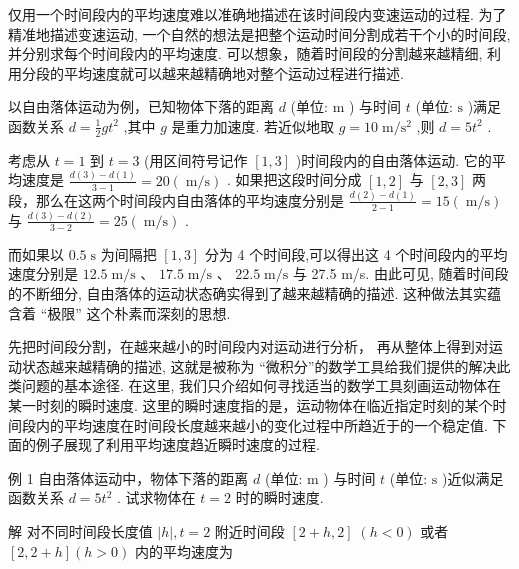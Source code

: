\documentclass[10pt]{article}
\begin{document}
仅用一个时间段内的平均速度难以准确地描述在该时间段内变速运动的过程. 为了精准地描述变速运动, 一个自然的想法是把整个运动时间分割成若干个小的时间段, 并分别求每个时间段内的平均速度. 可以想象，随着时间段的分割越来越精细, 利用分段的平均速度就可以越来越精确地对整个运动过程进行描述.

以自由落体运动为例，已知物体下落的距离 \(d\) (单位: \(\mathrm{m}\) ) 与时间 \(t\) (单位: \(\mathrm{s}\) )满足函数关系 \(d = \frac{1}{2}g{t}^{2}\) ,其中 \(g\) 是重力加速度. 若近似地取 \(g = {10}\mathrm{\;m}/{\mathrm{s}}^{2}\) ,则 \(d = 5{t}^{2}\) .

考虑从 \(t = 1\) 到 \(t = 3\) (用区间符号记作 \(\left\lbrack  {1,3}\right\rbrack\) )时间段内的自由落体运动. 它的平均速度是 \(\frac{d\left( 3\right)  - d\left( 1\right) }{3 - 1} = {20}\left( {\mathrm{\;m}/\mathrm{s}}\right)\) . 如果把这段时间分成 \(\left\lbrack  {1,2}\right\rbrack\) 与 \(\left\lbrack  {2,3}\right\rbrack\) 两段，那么在这两个时间段内自由落体的平均速度分别是 \(\frac{d\left( 2\right)  - d\left( 1\right) }{2 - 1} = {15}\left( {\mathrm{\;m}/\mathrm{s}}\right)\) 与 \(\frac{d\left( 3\right)  - d\left( 2\right) }{3 - 2} = {25}\left( {\mathrm{\;m}/\mathrm{s}}\right)\) .



而如果以 \({0.5}\mathrm{\;s}\) 为间隔把 \(\left\lbrack  {1,3}\right\rbrack\) 分为 4 个时间段,可以得出这 4 个时间段内的平均速度分别是 \({12.5}\mathrm{\;m}/\mathrm{s}\text{ 、 }{17.5}\mathrm{\;m}/\mathrm{s}\text{ 、 }{22.5}\mathrm{\;m}/\mathrm{s}\) 与 27.5 m/s. 由此可见, 随着时间段的不断细分, 自由落体的运动状态确实得到了越来越精确的描述. 这种做法其实蕴含着 “极限” 这个朴素而深刻的思想.

先把时间段分割，在越来越小的时间段内对运动进行分析， 再从整体上得到对运动状态越来越精确的描述, 这就是被称为 “微积分”的数学工具给我们提供的解决此类问题的基本途径. 在这里, 我们只介绍如何寻找适当的数学工具刻画运动物体在某一时刻的瞬时速度. 这里的瞬时速度指的是，运动物体在临近指定时刻的某个时间段内的平均速度在时间段长度越来越小的变化过程中所趋近于的一个稳定值. 下面的例子展现了利用平均速度趋近瞬时速度的过程.

例 1 自由落体运动中，物体下落的距离 \(d\) (单位: \(\mathrm{m}\) ) 与时间 \(t\) (单位: \(\mathrm{s}\) )近似满足函数关系 \(d = 5{t}^{2}\) . 试求物体在 \(t = 2\) 时的瞬时速度.

解 对不同时间段长度值 \(\left| h\right| ,t = 2\) 附近时间段 \(\left\lbrack  {2 + h,2}\right\rbrack \; \left( {h < 0}\right)\) 或者 \(\left\lbrack  {2,2 + h}\right\rbrack  \left( {h > 0}\right)\) 内的平均速度为
\end{document}

